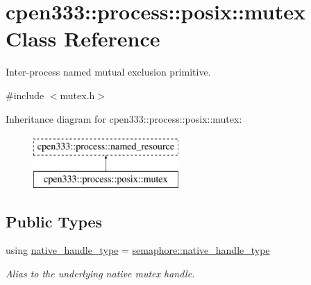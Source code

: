 \hypertarget{classcpen333_1_1process_1_1posix_1_1mutex}{}\section{cpen333\+:\+:process\+:\+:posix\+:\+:mutex Class Reference}
\label{classcpen333_1_1process_1_1posix_1_1mutex}


Inter-\/process named mutual exclusion primitive.  




{\ttfamily \#include $<$mutex.\+h$>$}

Inheritance diagram for cpen333\+:\+:process\+:\+:posix\+:\+:mutex\+:\begin{figure}[H]
\begin{center}
\leavevmode
\includegraphics[height=2.000000cm]{classcpen333_1_1process_1_1posix_1_1mutex}
\end{center}
\end{figure}
\subsection*{Public Types}
\begin{DoxyCompactItemize}
\item 
\mbox{\label{classcpen333_1_1process_1_1posix_1_1mutex_aac6d3675fcffc52ddf281e952968e44b}} 
using \hyperlink{classcpen333_1_1process_1_1posix_1_1mutex_aac6d3675fcffc52ddf281e952968e44b}{native\+\_\+handle\+\_\+type} = \hyperlink{classcpen333_1_1process_1_1posix_1_1semaphore_ad63150e5c8c196a84a7b214462756f1a}{semaphore\+::native\+\_\+handle\+\_\+type}
\begin{DoxyCompactList}\small\item\em Alias to the underlying native mutex handle. \end{DoxyCompactList}\end{DoxyCompactItemize}
